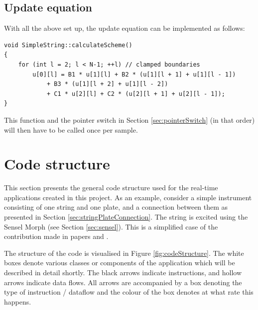 \subsection{Update equation}\label{sec:updateEquationCpp}
With all the above set up, the update equation can be implemented as follows:

\begin{lstlisting}[belowskip=-0.5\baselineskip]
void SimpleString::calculateScheme()
{
    for (int l = 2; l < N-1; ++l) // clamped boundaries
        u[0][l] = B1 * u[1][l] + B2 * (u[1][l + 1] + u[1][l - 1]) 
            + B3 * (u[1][l + 2] + u[1][l - 2])         
            + C1 * u[2][l] + C2 * (u[2][l + 1] + u[2][l - 1]);
}
\end{lstlisting}
This function and the pointer switch in Section \ref{sec:pointerSwitch} (in that order) will then have to be called once per sample.


\section{Code structure}\label{sec:codeStructure}
This section presents the general code structure used for the real-time applications created in this project. As an example, consider a simple instrument consisting of one string and one plate, and a connection between them as presented in Section \ref{sec:stringPlateConnection}. The string is excited using the Sensel Morph (see Section \ref{sec:sensel}). This is a simplified case of the contribution made in papers \citeP[A] and \citeP[B]. 

The structure of the code is visualised in Figure \ref{fig:codeStructure}. The white boxes denote various classes or components of the application which will be described in detail shortly. The black arrows indicate instructions, and hollow arrows indicate data flows. All arrows are accompanied by a box denoting the type of instruction / dataflow and the colour of the box denotes at what rate this happens.

